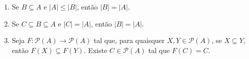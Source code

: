 \begin{lemma} \label{lema.set:CSB}
    \leavevmode
        \begin{enumerate}[leftmargin=*, align=left, label=\textbf{(\alph*)}]
            \item {}
            Se $B \subseteq A$ e $|A| \leq |B|$, então $|B| = |A|$.
            \item {} 
            Se $C \subseteq B \subseteq A$ e $|C| = |A|$, então $|B| = |A|$.
            \item {}
            Seja $F : \mathcal{P}(A) \to \mathcal{P}(A)$ tal que, para quaisquer $X,Y \in \mathcal{P}(A)$, se $X \subseteq Y$, então $F(X) \subseteq F(Y)$. Existe $C \in \mathcal{P}(A)$ tal que $F(C) = C$.
        \end{enumerate}
\end{lemma}

